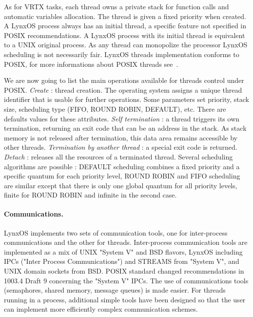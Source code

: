 \documentclass[10pt]{report}
\begin{document}
As for VRTX tasks, each thread owns a private stack for function calls and automatic variables allocation. The thread is given a fixed
priority when created. A LynxOS process always has an initial thread, a specific feature not specified in POSIX recommendations.
A LynxOS process with its initial thread is equivalent to a UNIX original process. As any thread can
monopolize the processor LynxOS scheduling is not necessarily fair. LynxOS threads implementation conforms to POSIX, for more
informations about POSIX threads see~\cite{JMR:94}.

We are now going to list the main operations available for threads control under POSIX. {\em Create} : thread creation.
The operating system assigns a unique thread identifier that is usable for further operations. Some parameters set priority, stack size,
scheduling type (FIFO, ROUND ROBIN, DEFAULT), etc. There are defaults values for these attributes. {\em Self termination} :
a thread triggers its own termination, returning an exit code that can be an address in the stack. As stack memory is not released after
termination, this data area remains accessible by other threads. {\em Termination by another thread} : a special exit code is returned.
{\em Detach } : releases all the resources of a terminated thread. Several scheduling algorithms are possible : DEFAULT scheduling
combines a fixed priority and a specific quantum for each priority level, ROUND ROBIN and FIFO scheduling are similar except that there
is only one global quantum for all priority levels, finite for ROUND ROBIN and infinite in the second case.

\paragraph{Communications.} LynxOS implements two sets of communication tools, one for inter-process communications and the other for
threads. Inter-process communication tools are implemented as a mix of UNIX "System V" and BSD flavors, LynxOS including IPCs ("Inter
Process Communications") and STREAMS from "System V", and UNIX domain sockets from BSD. POSIX standard changed recommendations
in 1003.4 Draft 9 concerning the "System V" IPCs. The use of communications tools (semaphores, shared memory, message queues) is made
easier. For threads running in a process, additional simple tools have been designed so that the user can implement more efficiently
complex communication schemes.
\end{document}
